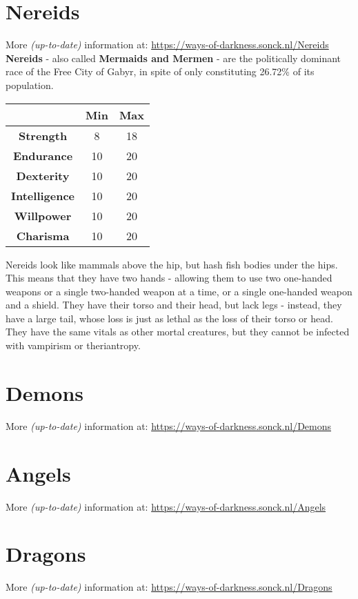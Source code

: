 \documentclass[openany,10pt,a4paper]{book}
\begin{document}
\section{Nereids}
More \textit{(up-to-date)} information at: \url{https://ways-of-darkness.sonck.nl/Nereids}\newline
\textbf{Nereids} - also called \textbf{Mermaids and Mermen} - are the politically dominant race of the Free City of Gabyr, in spite of only constituting 26.72\% of its population.\newline
\begin{tabular}{|c|c|c|}
\hline
 & \textbf{Min} & \textbf{Max} \\ \hline
\textbf{Strength} & 8 & 18 \\ \hline
\textbf{Endurance} & 10 & 20 \\ \hline
\textbf{Dexterity} & 10 & 20 \\ \hline
\textbf{Intelligence} & 10 & 20 \\ \hline
\textbf{Willpower} & 10 & 20 \\ \hline
\textbf{Charisma} & 10 & 20 \\ \hline
\end{tabular}\newline
Nereids look like mammals above the hip, but hash fish bodies under the hips. This means that they have two hands - allowing them to use two one-handed weapons or a single two-handed weapon at a time, or a single one-handed weapon and a shield. They have their torso and their head, but lack legs - instead, they have a large tail, whose loss is just as lethal as the loss of their torso or head. They have the same vitals as other mortal creatures, but they cannot be infected with vampirism or theriantropy.\newpage
\section{Demons}
More \textit{(up-to-date)} information at: \url{https://ways-of-darkness.sonck.nl/Demons}\newline
\section{Angels}
More \textit{(up-to-date)} information at: \url{https://ways-of-darkness.sonck.nl/Angels}\newline
\section{Dragons}
More \textit{(up-to-date)} information at: \url{https://ways-of-darkness.sonck.nl/Dragons}\newline
\end{document}
